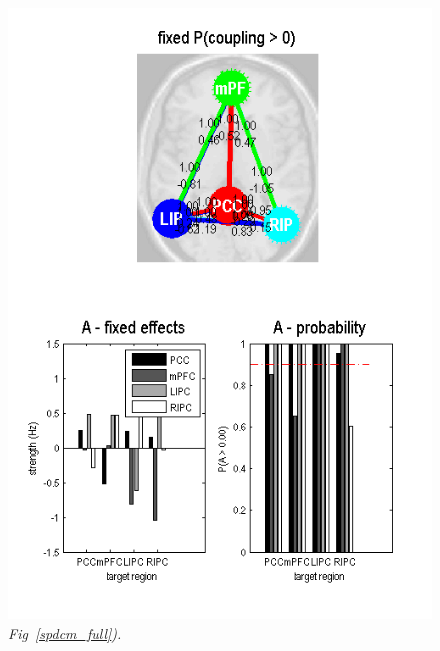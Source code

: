 \begin{figure}[ht]
\begin{center}
\includegraphics[width=140mm]{dcm_rs/Fig3}
\caption{\em Fig~\ref{spdcm_full}).\label{spdcm_Fig3}}
\end{center}
\end{figure}
